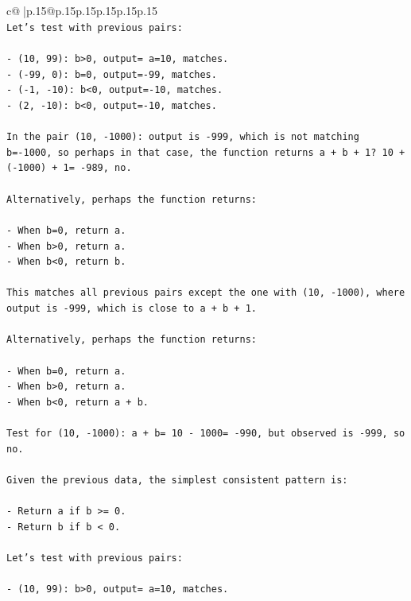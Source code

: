 \documentclass{article}
\begin{document}
{\begin{supertabular}{c@{$\;$}|p{.15\linewidth}@{}p{.15\linewidth}p{.15\linewidth}p{.15\linewidth}p{.15\linewidth}p{.15\linewidth}}
{{{\\ 
\texttt{Let's test with previous pairs:} \\
\\ 
\texttt{{-} (10, 99): b>0, output= a=10, matches.} \\
\texttt{{-} ({-}99, 0): b=0, output={-}99, matches.} \\
\texttt{{-} ({-}1, {-}10): b<0, output={-}10, matches.} \\
\texttt{{-} (2, {-}10): b<0, output={-}10, matches.} \\
\\ 
\texttt{In the pair (10, {-}1000): output is {-}999, which is not matching b={-}1000, so perhaps in that case, the function returns a + b + 1? 10 + ({-}1000) + 1= {-}989, no.} \\
\\ 
\texttt{Alternatively, perhaps the function returns:} \\
\\ 
\texttt{{-} When b=0, return a.} \\
\texttt{{-} When b>0, return a.} \\
\texttt{{-} When b<0, return b.} \\
\\ 
\texttt{This matches all previous pairs except the one with (10, {-}1000), where output is {-}999, which is close to a + b + 1.} \\
\\ 
\texttt{Alternatively, perhaps the function returns:} \\
\\ 
\texttt{{-} When b=0, return a.} \\
\texttt{{-} When b>0, return a.} \\
\texttt{{-} When b<0, return a + b.} \\
\\ 
\texttt{Test for (10, {-}1000): a + b= 10 {-} 1000= {-}990, but observed is {-}999, so no.} \\
\\ 
\texttt{Given the previous data, the simplest consistent pattern is:} \\
\\ 
\texttt{{-} Return a if b >= 0.} \\
\texttt{{-} Return b if b < 0.} \\
\\ 
\texttt{Let's test with previous pairs:} \\
\\ 
\texttt{{-} (10, 99): b>0, output= a=10, matches.} \\
}}}
\end{supertabular}}
\end{document}
